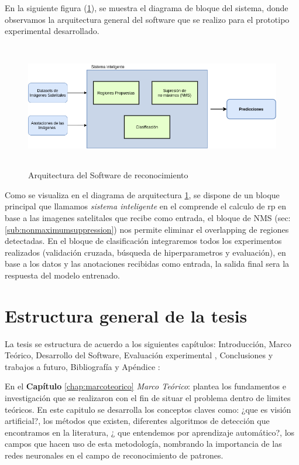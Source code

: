 En la siguiente figura (\ref{Fig: diagbloque}), se muestra el diagrama de bloque del sistema, donde observamos la arquitectura general del software que se realizo para el prototipo experimental desarrollado. 

\begin{figure}[H]
 \centering
  \includegraphics[height=5.5cm,keepaspectratio=true,clip=true]{imagenes/Logos/DB-Sistema.png}
  \caption{Arquitectura del Software de reconocimiento}
	\label{Fig: diagbloque}
 \end{figure}
 
Como se visualiza en el diagrama de arquitectura \ref{Fig: diagbloque}, se dispone de un bloque principal que llamamos \textit{sistema inteligente} en el comprende el calculo de \ac{rp} en base a las imagenes satelitales que recibe como entrada, el bloque de NMS (sec: \ref{sub:nonmaximumsuppression}) nos permite eliminar el overlapping de regiones detectadas. En el bloque de clasificación integraremos todos los experimentos realizados (validación cruzada, búsqueda de hiperparametros y evaluación), en base a los datos y las anotaciones recibidas como entrada, la salida final sera la respuesta del modelo entrenado.

\section{Estructura general de la tesis }\label{sec:estructura}


La tesis se estructura de acuerdo a los siguientes capítulos: Introducción, Marco Teórico, Desarrollo del Software, Evaluación experimental , Conclusiones y trabajos a futuro, Bibliografía y Apéndice :

En el \textbf{Capítulo} \ref{chap:marcoteorico} \textit{Marco Teórico}: plantea los fundamentos e investigación que se realizaron con el fin de situar el problema dentro de limites teóricos. En este capitulo se desarrolla los conceptos claves como: ¿que es visión artificial?, los métodos que existen, diferentes algoritmos de detección que encontramos en la literatura, ¿ que entendemos por aprendizaje automático?, los campos que hacen uso de esta metodología, nombrando la importancia de las redes neuronales en el campo de reconocimiento de patrones.

